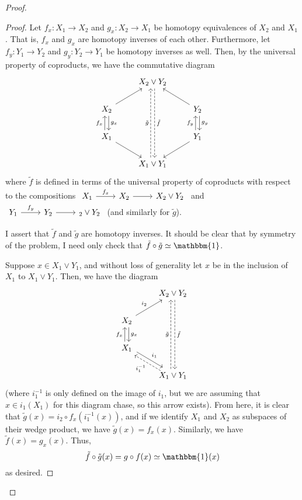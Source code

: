 \documentclass[fontsize=11pt]{scrartcl} %
\numberwithin{equation}{section} %
\numberwithin{figure}{section} %
\numberwithin{table}{section} %
\begin{document}
\begin{proof}
\begin{proof}
        Let $f_x:X_1\to X_2$ and $g_x:X_2\to X_1$ be homotopy equivalences of
        $X_2$ and $X_1$. That is, $f_x$ and $g_x$ are homotopy inverses of each
        other. Furthermore, let $f_y:Y_1\to Y_2$ and $g_y:Y_2\to Y_1$ be
        homotopy inverses as well. Then, by the universal property of
        coproducts, we have the commutative diagram
        \[
\begin{tikzcd}
    &X_2\vee Y_2\arrow[dashed, shift left]{ddd}{\tilde{f}}\\
    X_2\arrow{ur}\arrow[shift left]{d}{g_x} &&Y_2\arrow{ul}\arrow[shift left]{d}{g_y}\\
    X_1\arrow{dr}\arrow[shift left]{u}{f_x} &&Y_1\arrow{dl}\arrow[shift left]{u}{f_y}\\
    &X_1\vee Y_1\arrow[dashed, shift left]{uuu}{\tilde{g}}
\end{tikzcd}
        \]
        where $\tilde{f}$ is defined in terms of the universal
        property of coproducts with respect to the compositions
        $\begin{tikzcd}X_1\arrow{r}{f_x} &X_2\arrow{r}&X_2\vee Y_2\end{tikzcd}$
        and
        $\begin{tikzcd}Y_1\arrow{r}{f_y} &Y_2\arrow{r}&_2\vee Y_2\end{tikzcd}$
        (and similarly for $\tilde{g}$).

        I assert that $\tilde{f}$ and $\tilde{g}$ are homotopy inverses. It
        should be clear that by symmetry of the problem, I need only check that
        $\tilde{f}\circ\tilde{g}\simeq\mathbbm{1}$. 

        Suppose $x\in X_1\vee Y_1$, and without loss of generality let $x$ be in
        the inclusion of $X_1$ to $X_1\vee Y_1$. Then, we have the diagram
        \[
\begin{tikzcd}
    &X_2\vee Y_2\arrow[dashed, shift left]{ddd}{\tilde{f}}\\
    X_2\arrow{ur}{i_2}\arrow[shift left]{d}{g_x}\\
    X_1\arrow[shift left]{dr}{i_1}\arrow[shift left]{u}{f_x}\\
    &X_1\vee Y_1\arrow[dashed, shift left]{uuu}{\tilde{g}}
    \arrow[dashed,shift left]{ul}{i_1^{-1}}
\end{tikzcd}
        \]
        (where $i_1^{-1}$ is only defined on the image of $i_1$, but we are
            assuming that $x\in i_1(X_1)$ for this diagram chase, so this arrow
        exists).
        From here, it is clear that $\tilde{g}(x) = i_2\circ f_x(i_1^{-1}(x))$,
        and if we identify $X_1$ and $X_2$ as subspaces of their wedge product,
        we have $\tilde{g}(x) = f_x(x)$. Similarly, we have $\tilde{f}(x) =
        g_x(x)$. Thus,
        \[
            \tilde{f}\circ\tilde{g}(x) = g\circ f(x)\simeq \mathbbm{1}(x)
        \]
        as desired.


\end{proof}
\end{proof}
\end{document}
